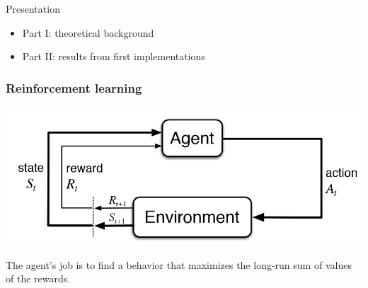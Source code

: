 \documentclass[dvipsnames,svgnames]{beamer}
\begin{document}
\begin{frame}{Presentation}
\begin{block}{}
\begin{itemize}
\item Part I: theoretical background 
\item Part II: results from first implementations
\end{itemize}
\end{block}
\end{frame}

\begin{frame}
\frametitle{Reinforcement learning}
\centering
\includegraphics[scale=0.5]{img/RL_graph.png}
\vspace{1cm}

The agent's job is to find a behavior that maximizes the long-run sum of values of the rewards.
\end{frame}
\end{document}
